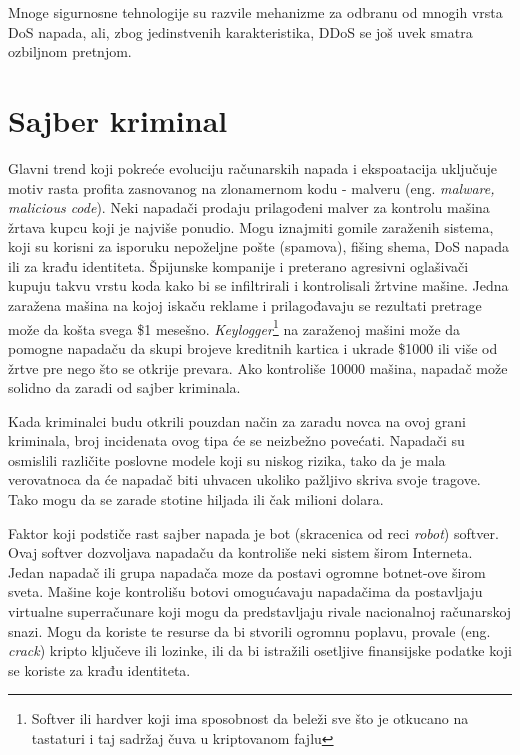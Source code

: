 \documentclass[a4paper]{article}
\theoremstyle{break}
\begin{document}
{Mnoge sigurnosne tehnologije su razvile mehanizme za odbranu od mnogih vrsta DoS napada, ali, zbog jedinstvenih karakteristika, DDoS se još uvek smatra ozbiljnom pretnjom.

\section{Sajber kriminal}
\label{sec:sajber_kriminal}


Glavni trend koji pokreće evoluciju računarskih napada i ekspoatacija uključuje motiv rasta profita zasnovanog na zlonamernom kodu - malveru (eng. {\em malware, malicious code}). Neki napadači prodaju prilagođeni malver za kontrolu mašina žrtava kupcu koji je najviše ponudio. Mogu iznajmiti gomile zaraženih sistema, koji su korisni za isporuku nepoželjne pošte (spamova), fišing shema, DoS napada ili za krađu identiteta. Špijunske kompanije i preterano agresivni oglašivači kupuju takvu vrstu koda kako bi se infiltrirali i kontrolisali žrtvine mašine. Jedna zaražena mašina na kojoj iskaču reklame i prilagođavaju se rezultati pretrage može da košta svega \$1 mesešno. {\em Keylogger}\footnote{Softver ili hardver koji ima sposobnost da beleži sve što je otkucano na tastaturi i taj sadržaj čuva u kriptovanom fajlu} na zaraženoj mašini može da pomogne napadaču da skupi brojeve kreditnih kartica i ukrade \$1000 ili više od žrtve pre nego što se otkrije prevara. Ako kontroliše 10000 mašina, napadač može solidno da zaradi od sajber kriminala. 

Kada kriminalci budu otkrili pouzdan način za zaradu novca na ovoj grani kriminala, broj incidenata ovog tipa će se neizbežno povećati. Napadači su osmislili različite poslovne modele koji su niskog rizika, tako da je mala verovatnoca da će napadač biti uhvacen ukoliko pažljivo skriva svoje tragove. Tako mogu da se zarade stotine hiljada ili čak milioni dolara.

Faktor koji podstiče rast sajber napada je bot (skracenica od reci \textit{robot}) softver. Ovaj softver dozvoljava napadaču da kontroliše neki sistem širom Interneta. Jedan napadač ili grupa napadača moze da postavi ogromne botnet-ove širom sveta. Mašine koje kontrolišu botovi omogućavaju napadačima da postavljaju virtualne superračunare koji mogu da predstavljaju rivale nacionalnoj računarskoj snazi. Mogu da koriste te resurse da bi stvorili ogromnu poplavu, provale (eng. {\em crack}) kripto ključeve ili lozinke, ili da bi istražili osetljive finansijske podatke koji se koriste za krađu identiteta.

}
\end{document}
